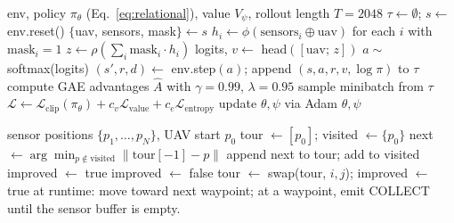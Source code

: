 \begin{algorithm}[H]
\caption{Relational-RL (PPO) with permutation-invariant policy.}
\label{alg:relational}
\begin{algorithmic}[1]
\Require env, policy $\pi_\theta$ (Eq.~\ref{eq:relational}), value
         $V_\psi$, rollout length $T = 2048$
  \State $\tau \gets \emptyset$; $s \gets$ env.reset()
    \State $\{$uav, sensors, mask$\} \gets s$
    \State $h_i \gets \phi(\text{sensors}_i \oplus \text{uav})$ for each $i$ with $\text{mask}_i = 1$
    \State $z \gets \rho(\sum_i \text{mask}_i \cdot h_i)$
    \State logits, $v \gets$ head$([\text{uav};\, z])$
    \State $a \sim $ softmax(logits)
    \State $(s', r, d) \gets$ env.step$(a)$; append $(s, a, r, v, \log \pi)$ to $\tau$
  \EndFor
  \State compute GAE advantages $\hat{A}$ with $\gamma = 0.99$, $\lambda = 0.95$
    \State sample minibatch from $\tau$
    \State $\mathcal{L} \gets \mathcal{L}_{\text{clip}}(\pi_\theta) + c_v \mathcal{L}_{\text{value}} + c_e \mathcal{L}_{\text{entropy}}$
    \State update $\theta, \psi$ via Adam
  \EndFor
\EndFor
\State \Return $\theta, \psi$
\end{algorithmic}
\end{algorithm}

\begin{algorithm}[H]
\caption{TSP-Oracle (Nearest-Neighbour $+$ 2-opt) routing policy.}
\label{alg:tsp}
\begin{algorithmic}[1]
\Require sensor positions $\{p_1, \ldots, p_N\}$, UAV start $p_0$
\State tour $\gets [p_0]$; visited $\gets \{p_0\}$
 
  \State next $\gets \arg\min_{p \notin \text{visited}} \|\text{tour}[-1] - p\|$
  \State append next to tour; add to visited
\EndWhile
\State improved $\gets$ true 
  \State improved $\gets$ false
      \State tour $\gets$ swap(tour, $i, j$); improved $\gets$ true
    \EndIf
  \EndFor
\EndWhile
\State at runtime: move toward next waypoint; at a waypoint, emit COLLECT until the sensor buffer is empty.
\end{algorithmic}
\end{algorithm}

